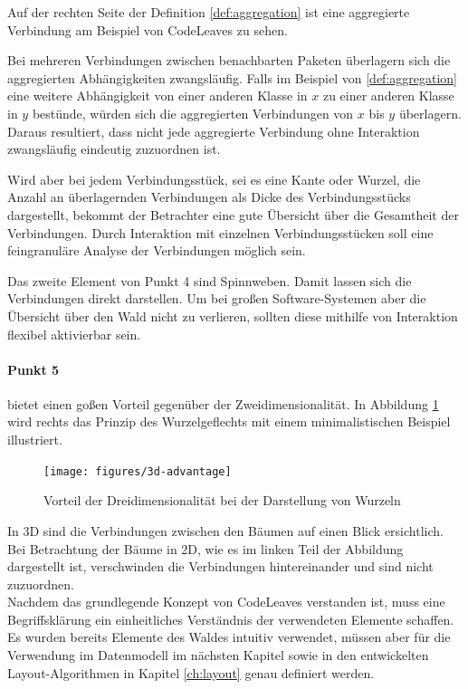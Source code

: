 Auf der rechten Seite der Definition \ref{def:aggregation} ist eine aggregierte Verbindung am Beispiel von CodeLeaves zu sehen.

Bei mehreren Verbindungen zwischen benachbarten Paketen überlagern sich die aggregierten Abhängigkeiten zwangsläufig. Falls im Beispiel von \ref{def:aggregation} eine weitere Abhängigkeit von einer anderen Klasse in $x$ zu einer anderen Klasse in $y$ bestünde, würden sich die aggregierten Verbindungen von $x$ bis $y$ überlagern. Daraus resultiert, dass nicht jede aggregierte Verbindung ohne Interaktion zwangsläufig eindeutig zuzuordnen ist.

Wird aber bei jedem Verbindungsstück, sei es eine Kante oder Wurzel, die Anzahl an überlagernden Verbindungen als Dicke des Verbindungsstücks dargestellt, bekommt der Betrachter eine gute Übersicht über die Gesamtheit der Verbindungen. Durch Interaktion mit einzelnen Verbindungsstücken soll eine feingranuläre Analyse der Verbindungen möglich sein.

Das zweite Element von Punkt 4 sind Spinnweben. Damit lassen sich die Verbindungen direkt darstellen. Um bei großen Software-Systemen aber die Übersicht über den Wald nicht zu verlieren, sollten diese mithilfe von Interaktion flexibel aktivierbar sein.

\paragraph{Punkt 5} bietet einen goßen Vorteil gegenüber der Zweidimensionalität. In Abbildung \ref{fig:3d-advantage} wird rechts das Prinzip des Wurzelgeflechts mit einem minimalistischen Beispiel illustriert.

\begin{figure}[htb]
  \texttt{[image: figures/3d-advantage]}
  \caption{Vorteil der Dreidimensionalität bei der Darstellung von Wurzeln}
  \label{fig:3d-advantage}
\end{figure}

In 3D sind die Verbindungen zwischen den Bäumen auf einen Blick ersichtlich. Bei Betrachtung der Bäume in 2D, wie es im linken Teil der Abbildung dargestellt ist, verschwinden die Verbindungen hintereinander und sind nicht zuzuordnen.\\

Nachdem das grundlegende Konzept von CodeLeaves verstanden ist, muss eine Begriffsklärung ein einheitliches Verständnis der verwendeten Elemente schaffen. Es wurden bereits Elemente des Waldes intuitiv verwendet, müssen aber für die Verwendung im Datenmodell im nächsten Kapitel sowie in den entwickelten Layout-Algorithmen in Kapitel \ref{ch:layout} genau definiert werden.

